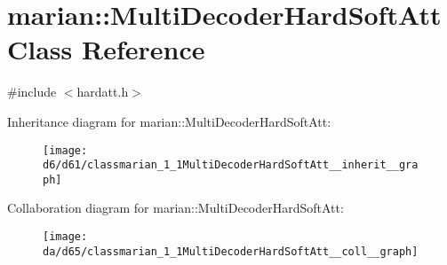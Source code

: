 \hypertarget{classmarian_1_1MultiDecoderHardSoftAtt}{}\section{marian\+:\+:Multi\+Decoder\+Hard\+Soft\+Att Class Reference}
\label{classmarian_1_1MultiDecoderHardSoftAtt}


{\ttfamily \#include $<$hardatt.\+h$>$}



Inheritance diagram for marian\+:\+:Multi\+Decoder\+Hard\+Soft\+Att\+:
\nopagebreak
\begin{figure}[H]
\begin{center}
\leavevmode
\texttt{[image: d6/d61/classmarian\_1\_1MultiDecoderHardSoftAtt\_\_inherit\_\_graph]}
\end{center}
\end{figure}


Collaboration diagram for marian\+:\+:Multi\+Decoder\+Hard\+Soft\+Att\+:
\nopagebreak
\begin{figure}[H]
\begin{center}
\leavevmode
\texttt{[image: da/d65/classmarian\_1\_1MultiDecoderHardSoftAtt\_\_coll\_\_graph]}
\end{center}
\end{figure}
